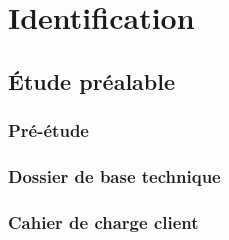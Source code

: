 

\begin{comment}

\documentclass[a4paper, 11pt, twoside, fleqn]{memoir}

\usepackage{AOCDTF-cnam}

\marqueurchapitre
\decoupagechapitre{1} %



	\openleft %

\end{comment}

\chapter{Identification}
\ChapFrame

\section{\'Etude préalable}

\subsection{Pré-étude}
\subsection{Dossier de base technique}
\subsection{Cahier de charge client}


%

